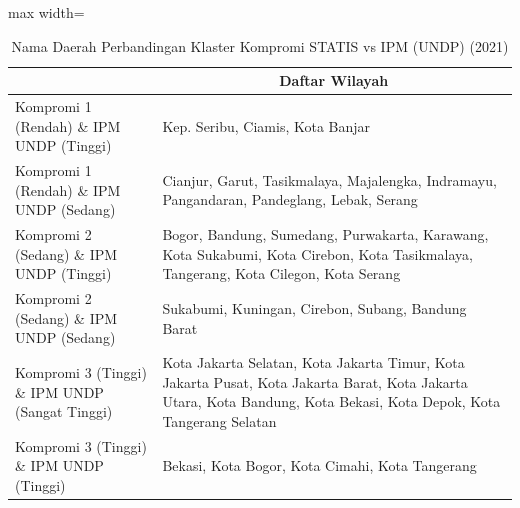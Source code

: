\begin{table}[H]
\centering
\caption{Nama Daerah Perbandingan Klaster Kompromi STATIS vs IPM (UNDP) (2021)} \label{tab:app2comp_ipm_name_2021}
\begin{adjustbox}{max width=\textwidth}
\begin{tabular}{|>{\centering\arraybackslash}p{4cm}|p{10cm}|}
\hline
\multicolumn{1}{|c|}{\textbf{Kategori}} & \multicolumn{1}{c|}{\textbf{Daftar Wilayah}} \\
\hline
Kompromi 1 (Rendah) \& IPM UNDP (Tinggi) & Kep. Seribu, Ciamis, Kota Banjar \\
\hline
Kompromi 1 (Rendah) \& IPM UNDP (Sedang) & Cianjur, Garut, Tasikmalaya, Majalengka, Indramayu, Pangandaran, Pandeglang, Lebak, Serang \\
\hline
Kompromi 2 (Sedang) \& IPM UNDP (Tinggi) & Bogor, Bandung, Sumedang, Purwakarta, Karawang, Kota Sukabumi, Kota Cirebon, Kota Tasikmalaya, Tangerang, Kota Cilegon, Kota Serang \\
\hline
Kompromi 2 (Sedang) \& IPM UNDP (Sedang) & Sukabumi, Kuningan, Cirebon, Subang, Bandung Barat \\
\hline
Kompromi 3 (Tinggi) \& IPM UNDP (Sangat Tinggi) & Kota Jakarta Selatan, Kota Jakarta Timur, Kota Jakarta Pusat, Kota Jakarta Barat, Kota Jakarta Utara, Kota Bandung, Kota Bekasi, Kota Depok, Kota Tangerang Selatan \\
\hline
Kompromi 3 (Tinggi) \& IPM UNDP (Tinggi) & Bekasi, Kota Bogor, Kota Cimahi, Kota Tangerang \\
\hline
\end{tabular}
\end{adjustbox}
\end{table}